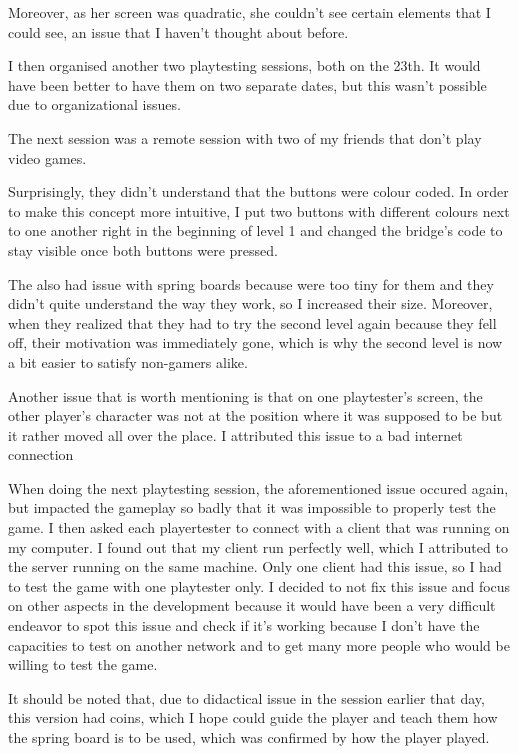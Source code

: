 \documentclass{article}
\begin{document}
Moreover, as her screen was quadratic, she couldn't see certain elements that I could see, an issue that I haven't thought about before.

\bigskip
I then organised another two playtesting sessions, both on the 23th. It would have been better to have them on two separate dates, but this wasn't possible due to organizational issues.

\bigskip
The next session was a remote session with two of my friends that don't play video games.

Surprisingly, they didn't understand that the buttons were colour coded. In order to make this concept more intuitive,  I put two buttons with different colours next to one another right in the beginning of level 1 and changed the bridge's code to stay visible once both buttons were pressed.

The also had issue with spring boards because were too tiny for them and they didn't quite understand the way they work, so I increased their size.
Moreover, when they realized that they had to try the second level again because they fell off, their motivation was immediately gone, which is why the second level is now a bit easier to satisfy non-gamers alike.

Another issue that is worth mentioning is that on one playtester's screen, the other player's character was not at the position where it was supposed to be but it rather moved all over the place. I attributed this issue to a bad internet connection

\bigskip
When doing the next playtesting session, the aforementioned issue occured again, but impacted the gameplay so badly that it was impossible to properly test the game. I then asked each playertester to connect with a client that was running on my computer. I found out that my client run perfectly well, which I attributed to the server running on the same machine. Only one client had this issue, so I had to test the game with one playtester only. I decided to not fix this issue and focus on other aspects in the development because it would have been a very difficult endeavor to spot this issue and check if it's working because I don't have the capacities to test on another network and to get many more people who would be willing to test the game.

It should be noted that, due to didactical issue in the session earlier that day, this version had coins, which I hope could guide the player and teach them how the spring board is to be used, which was confirmed by how the player played.
\end{document}
